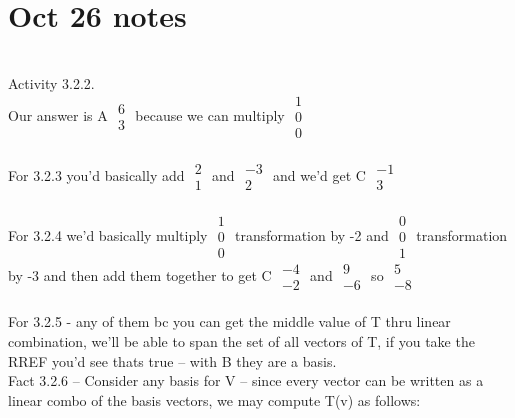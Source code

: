 \documentclass{article}
\begin{document}
\section*{Oct 26 notes}\\

Activity 3.2.2.\\
Our answer is A $\begin{matrix} 6 \\ 3\end{matrix}$ because we can multiply $\begin{matrix} 1\\0\\0 \end{matrix}$\\
\\
For 3.2.3 you'd basically add $\begin{matrix} 2\\1 \end{matrix}$ and $\begin{matrix} -3\\2\ \end{matrix}$ and we'd get C $\begin{matrix} -1\\3 \end{matrix}$\\
\\
For 3.2.4 we'd basically multiply $\begin{matrix} 1\\0\\0 \end{matrix}$ transformation by -2 and $\begin{matrix} 0\\0\\1 \end{matrix}$ transformation by -3 and then add them together to get C $\begin{matrix} -4\\-2 \end{matrix}$ and $\begin{matrix}9\\-6 \end{matrix}$ so $\begin{matrix} 5 \\-8 \end{matrix}$ \\
\\
For 3.2.5 - any of them bc you can get the middle value of T thru linear combination, we'll be able to span the set of all vectors of T, if you take the RREF you'd see thats true -- with B they are a basis.
\\
Fact 3.2.6 -- Consider any basis for V -- since every vector can be written as a linear combo of the basis vectors, we may compute T(v) as follows:
\end{document}
